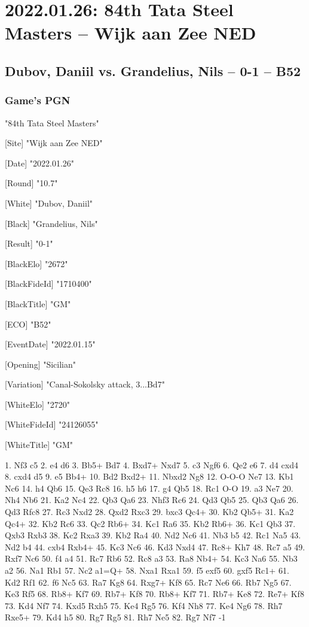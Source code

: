 \documentclass[9pt]{extarticle}
\begin{document}
\section*{2022.01.26: 84th Tata Steel Masters -- Wijk aan Zee NED}

\subsection*{Dubov, Daniil vs. Grandelius, Nils -- 0-1 -- B52}
\subsubsection*{Game's PGN}
\begin{flushleft}
[Event] "84th Tata Steel Masters"

[Site] "Wijk aan Zee NED"

[Date] "2022.01.26"

[Round] "10.7"

[White] "Dubov, Daniil"

[Black] "Grandelius, Nils"

[Result] "0-1"

[BlackElo] "2672"

[BlackFideId] "1710400"

[BlackTitle] "GM"

[ECO] "B52"

[EventDate] "2022.01.15"

[Opening] "Sicilian"

[Variation] "Canal-Sokolsky attack, 3...Bd7"

[WhiteElo] "2720"

[WhiteFideId] "24126055"

[WhiteTitle] "GM"

\end{flushleft}
\begin{flushleft}
1. Nf3 c5 2. e4 d6 3. Bb5+ Bd7 4. Bxd7+ Nxd7 5. c3 Ngf6 6. Qe2 e6 7. d4 cxd4 8. cxd4 d5 9. e5 Bb4+ 10. Bd2 Bxd2+ 11. Nbxd2 Ng8 12. O-O-O Ne7 13. Kb1 Nc6 14. h4 Qb6 15. Qe3 Rc8 16. h5 h6 17. g4 Qb5 18. Rc1 O-O 19. a3 Ne7 20. Nh4 Nb6 21. Ka2 Nc4 22. Qb3 Qa6 23. Nhf3 Rc6 24. Qd3 Qb5 25. Qb3 Qa6 26. Qd3 Rfc8 27. Rc3 Nxd2 28. Qxd2 Rxc3 29. bxc3 Qc4+ 30. Kb2 Qb5+ 31. Ka2 Qc4+ 32. Kb2 Rc6 33. Qc2 Rb6+ 34. Kc1 Ra6 35. Kb2 Rb6+ 36. Kc1 Qb3 37. Qxb3 Rxb3 38. Kc2 Rxa3 39. Kb2 Ra4 40. Nd2 Nc6 41. Nb3 b5 42. Rc1 Na5 43. Nd2 b4 44. cxb4 Rxb4+ 45. Kc3 Nc6 46. Kd3 Nxd4 47. Rc8+ Kh7 48. Rc7 a5 49. Rxf7 Nc6 50. f4 a4 51. Rc7 Rb6 52. Rc8 a3 53. Ra8 Nb4+ 54. Kc3 Na6 55. Nb3 a2 56. Na1 Rb1 57. Nc2 a1=Q+ 58. Nxa1 Rxa1 59. f5 exf5 60. gxf5 Rc1+ 61. Kd2 Rf1 62. f6 Nc5 63. Ra7 Kg8 64. Rxg7+ Kf8 65. Rc7 Ne6 66. Rb7 Ng5 67. Ke3 Rf5 68. Rb8+ Kf7 69. Rb7+ Kf8 70. Rb8+ Kf7 71. Rb7+ Ke8 72. Re7+ Kf8 73. Kd4 Nf7 74. Kxd5 Rxh5 75. Ke4 Rg5 76. Kf4 Nh8 77. Ke4 Ng6 78. Rh7 Rxe5+ 79. Kd4 h5 80. Rg7 Rg5 81. Rh7 Ne5 82. Rg7 Nf7 \quad  {}-1
\end{flushleft}
\end{document}
